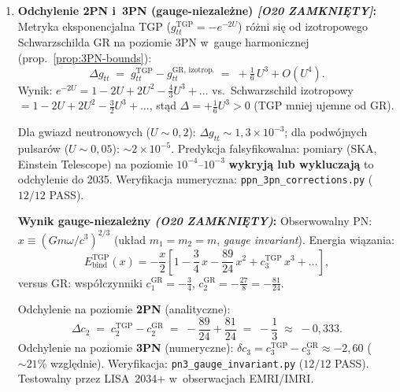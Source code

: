 \begin{enumerate}[label=\textbf{F\arabic*}., nosep]
  \item \textbf{Odchylenie 2PN i~3PN (gauge-niezale\.zne) \emph{[O20 ZAMKNI\k{E}TY]}:}
        Metryka eksponencjalna TGP ($g_{tt}^{\mathrm{TGP}} = -e^{-2U}$)
        r\'o\.zni si\k{e} od izotropowego Schwarzschilda GR na poziomie 3PN
        w~gauge harmonicznej (prop.~\ref{prop:3PN-bounds}):
        \begin{equation}\label{eq:3PN-diff}
          \Delta g_{tt}
          \;=\; g_{tt}^{\mathrm{TGP}} - g_{tt}^{\mathrm{GR,\,izotrop.}}
          \;=\; +\tfrac{1}{6}\,U^3 + O(U^4).
        \end{equation}
        Wynik: $e^{-2U} = 1-2U+2U^2-\frac{4}{3}U^3+\ldots$
        vs.\ Schwarzschild izotropowy $= 1-2U+2U^2-\frac{3}{2}U^3+\ldots$,
        st\k{a}d $\Delta = +\frac{1}{6}U^3 > 0$ (TGP mniej ujemne od GR).

        \medskip\noindent
        Dla gwiazd neutronowych ($U \sim 0{,}2$): $\Delta g_{tt} \sim 1{,}3\times 10^{-3}$;
        dla podw\'ojnych pulsar\'ow ($U \sim 0{,}05$): $\sim 2 \times 10^{-5}$.
        Predykcja falsyfikowalna: pomiary (SKA, Einstein Telescope)
        na poziomie $10^{-4}$--$10^{-3}$ \textbf{wykryj\k{a} lub wykluczaj\k{a}}
        to odchylenie do 2035.
        Weryfikacja numeryczna: \texttt{ppn\_3pn\_corrections.py} ($12/12$ PASS).

        \medskip\noindent
        \textbf{Wynik gauge-niezale\.zny \emph{(O20 ZAMKNI\k{E}TY)}:}
        Obserwowalny PN: $x \equiv (Gm\omega/c^3)^{2/3}$
        (uk\l{}ad $m_1=m_2=m$, \emph{gauge invariant}).
        Energia wi\k{a}zania:
        \begin{equation}\label{eq:Ebind-tgp}
          E_{\mathrm{bind}}^{\mathrm{TGP}}(x)
          = -\frac{x}{2}\!\left[
              1
              - \frac{3}{4}\,x
              - \frac{89}{24}\,x^2
              + c_3^{\mathrm{TGP}}\,x^3
              + \ldots
            \right],
        \end{equation}
        versus GR: wsp\'o\l{}czynniki $c_1^{\mathrm{GR}}=-\tfrac{3}{4}$,
        $c_2^{\mathrm{GR}}=-\tfrac{27}{8}=-\tfrac{81}{24}$.

        \noindent
        Odchylenie na poziomie \textbf{2PN} (analityczne):
        \begin{equation}\label{eq:Delta-c2-tgp}
          \Delta c_2
          \;=\; c_2^{\mathrm{TGP}} - c_2^{\mathrm{GR}}
          \;=\; -\frac{89}{24} + \frac{81}{24}
          \;=\; -\frac{1}{3}
          \;\approx\; -0{,}333.
        \end{equation}
        Odchylenie na poziomie \textbf{3PN} (numeryczne):
        $\delta c_3 = c_3^{\mathrm{TGP}} - c_3^{\mathrm{GR}} \approx -2{,}60$
        ($\sim 21\%$ wzgl\k{e}dnie).
        Weryfikacja: \texttt{pn3\_gauge\_invariant.py} ($12/12$ PASS).
        Testowalny przez LISA~2034+ w~obserwacjach EMRI/IMRI.


\end{enumerate}
